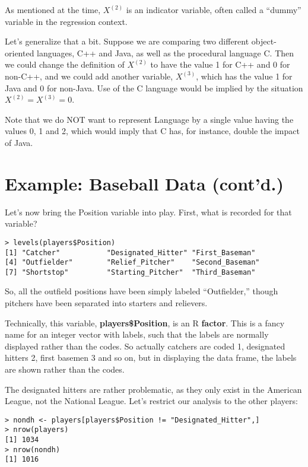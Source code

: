 As mentioned at the time, $X^{(2)}$ is an indicator variable, often
called a ``dummy'' variable in the regression context.

Let's generalize that a bit.  Suppose we are comparing two different
object-oriented languages, C++ and Java, as well as the procedural
language C.  Then we could change the definition of $X^{(2)}$ to have
the value 1 for C++ and 0 for non-C++, and we could add another
variable, $X^{(3)}$, which has the value 1 for Java and 0 for non-Java.
Use of the C language would be implied by the situation $X^{(2)} =
X^{(3)} = 0$.

Note that we do NOT want to represent Language by a single value having
the values 0, 1 and 2, which would imply that C has, for instance,
double the impact of Java.

\section{Example:  Baseball Data (cont'd.)}
\label{baseball3}

Let's now bring the Position variable into play.  First, what is
recorded for that variable?

\begin{lstlisting}
> levels(players$Position)
[1] "Catcher"           "Designated_Hitter" "First_Baseman"    
[4] "Outfielder"        "Relief_Pitcher"    "Second_Baseman"   
[7] "Shortstop"         "Starting_Pitcher"  "Third_Baseman"    
\end{lstlisting}

So, all the outfield positions have been simply labeled ``Outfielder,''
though pitchers have been separated into starters and relievers.

Technically, this variable, {\bf players\$Position}, is an R {\bf
factor}.  This is a fancy name for an integer vector with labels, such
that the labels are normally displayed rather than the codes.  So
actually catchers are coded 1, designated hitters 2, first basemen 3 and
so on, but in displaying the data frame, the labels are shown rather
than the codes.

The designated hitters are rather problematic, as they only exist in the
American League, not the National League.  Let's restrict our analysis
to the other players:

\begin{lstlisting}
> nondh <- players[players$Position != "Designated_Hitter",]
> nrow(players)
[1] 1034
> nrow(nondh)
[1] 1016
\end{lstlisting}


